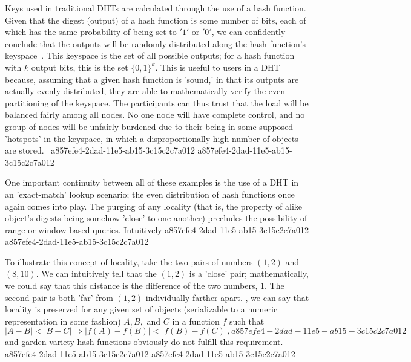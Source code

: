 \documentclass[12pt]{article}
\begin{document}
\par Keys used in traditional DHTs are calculated through the use of a hash function. Given that the digest (output) of a hash function is some number of bits, each of which has the same probability of being set to $'1'$ or $'0'$, we can confidently conclude that the outputs will be randomly distributed along the hash function's keyspace~. This keyspace is the set of all possible outputs; for a hash function with $k$ output bits, this is the set $\{0,1\}^k$. This is useful to users in a DHT because, assuming that a given hash function is 'sound,' in that its outputs are actually evenly distributed, they are able to mathematically verify the even partitioning of the keyspace. The participants can thus trust that the load will be balanced fairly among all nodes. No one node will have complete control, and no group of nodes will be unfairly burdened due to their being in some supposed 'hotspots' in the keyspace, in which a disproportionally high number of objects are stored.~
a857efe4-2dad-11e5-ab15-3c15c2c7a012
a857efe4-2dad-11e5-ab15-3c15c2c7a012\par One important continuity between all of these examples is the use of a DHT in an 'exact-match' lookup scenario; the even distribution of hash functions once again comes into play. The purging of any locality (that is, the property of alike object's digests being somehow 'close' to one another) precludes the possibility of range or window-based queries. Intuitively
a857efe4-2dad-11e5-ab15-3c15c2c7a012
a857efe4-2dad-11e5-ab15-3c15c2c7a012\par To illustrate this concept of locality, take the two pairs of numbers $(1,2)$ and $(8,10)$. We can intuitively tell that the $(1,2)$ is a 'close' pair; mathematically, we could say that this distance is the difference of the two numbers, $1$. The second pair is both 'far' from $(1,2)$ individually farther apart. , we can say that locality is preserved for any given set of objects (serializable to a numeric representation in some fashion) $A,B,$ and $C$ in a function $f$ such that
\begin{equation}
|A-B| < |B-C| \Rightarrow |f(A)-f(B)| < |f(B) - f(C)|,
a857efe4-2dad-11e5-ab15-3c15c2c7a012\end{equation}
and garden variety hash functions obviously do not fulfill this requirement.
a857efe4-2dad-11e5-ab15-3c15c2c7a012
\printbibliography
a857efe4-2dad-11e5-ab15-3c15c2c7a012
\end{document}
